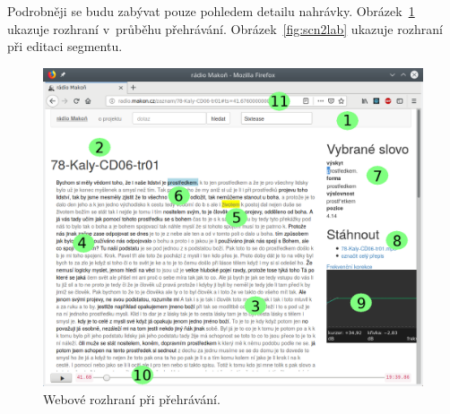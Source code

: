Podrobněji se budu zabývat pouze pohledem detailu nahrávky.
Obrázek~\ref{fig:scn1lab} ukazuje rozhraní v~průběhu přehrávání.
Obrázek~\ref{fig:scn2lab} ukazuje rozhraní při editaci segmentu.

\begin{figure}[htpb]
\includegraphics[scale=0.65]{rc/radio-makon-cs-1-lab.png}
\caption{Webové rozhraní při přehrávání.}
\label{fig:scn1lab}
\end{figure}

